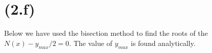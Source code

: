 \section{(2.f)}
Below we have used the bisection method to find the roots of the $N(x)-y_{max}/2=0$. The value of $y_{max}$ is found analytically.



